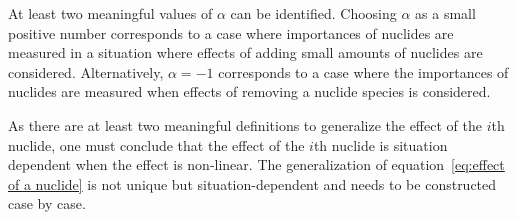 At least two meaningful values of $\alpha$ can be identified. Choosing $\alpha$ as a small positive number corresponds to a case where importances of nuclides are measured in a situation where effects of adding small amounts of nuclides are considered. Alternatively, $\alpha=-1$ corresponds to a case where the importances of nuclides are measured when effects of removing a nuclide species is considered.

As there are at least two meaningful definitions to generalize the effect of the $i$th nuclide, one must conclude that the effect of the $i$th nuclide is situation dependent when the effect is non-linear. The generalization of equation~\eqref{eq:effect of a nuclide} is not unique but situation-dependent and needs to be constructed case by case.







